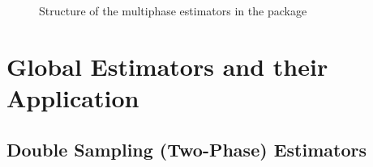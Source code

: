 \documentclass[article]{jss}
\begin{document}
\begin{figure}[htb]
\centering
{}
\caption{Structure of the multiphase estimators in the  package }
\label{fig:struct_package}
\end{figure}




%






\section[Global Estimators and their Application in R]{Global Estimators and their Application}
\label{sec:globest_and_appl}


\subsection{Double Sampling (Two-Phase) Estimators}
\end{document}

